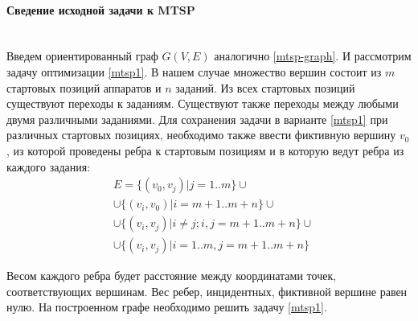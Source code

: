 \documentclass[a4paper,14pt,russian]{article}
\begin{document}
\paragraph{Сведение исходной задачи к MTSP} ~\\

Введем ориентированный граф $G(V, E)$ аналогично \eqref{mtsp-graph}. И рассмотрим задачу оптимизации \eqref{mtsp1}.
В нашем случае множество вершин состоит из $m$ стартовых позиций аппаратов и $n$ заданий. Из всех стартовых позиций существуют переходы к заданиям. Существуют также переходы между любыми двумя различными заданиями. Для сохранения задачи в варианте \eqref{mtsp1} при различных стартовых позициях, необходимо также ввести фиктивную вершину $v_0$, из которой проведены ребра к стартовым позициям и в которую ведут ребра из каждого задания:
\begin{align*}
& E = \{(v_0, v_j)|j = 1..m\} \cup \\
& \cup \{(v_i, v_0) | i = m+1..m+n\} \cup  \\
& \cup \{(v_i, v_j)| i \neq j; i,j=m+1..m+n\} \cup \\
& \cup \{(v_i, v_j)| i = 1..m, j = m+1..m+n\}
\end{align*}

Весом каждого ребра будет расстояние между координатами точек, соответствующих вершинам. Вес ребер, инцидентных, фиктивной вершине равен нулю.
На построенном графе необходимо решить задачу \eqref{mtsp1}.

\end{document}
